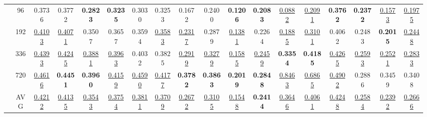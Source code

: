 \begin{table}[!t]
{{\begin{tabular}{l|c|cc|cc|cc|cc|cc|cc|cc|cc}
& 96  & 0.3736 & 0.3772 & \textbf{0.2823} & \textbf{0.3235} & 0.3030 & 0.3253 & 0.1672 & 0.2400 & \textbf{0.1206} & \textbf{0.2083} & \underline{0.0882} & \underline{0.2091} & \textbf{0.3762} & \textbf{0.2372} & \underline{0.1573} & \underline{0.1975} \\
& 192 & \underline{0.4103} & \underline{0.4071} & 0.3507 & 0.3657 & 0.3594 & \underline{0.3583} & \underline{0.2317} & 0.2879 & \underline{0.1381} & 0.2264 & \underline{0.1885} & \underline{0.3101} & 0.4062 & 0.2483 & \textbf{0.2015} & \underline{0.2448} \\
& 336 & \underline{0.4393} & \underline{0.4245} & \underline{0.3881} & \underline{0.3963} & 0.4032 & 0.3825 & \underline{0.2919} & \underline{0.3279} & \underline{0.1585} & \underline{0.2459} & \textbf{0.3354} & \textbf{0.4185} & \underline{0.4265} & \underline{0.2593} & \underline{0.2521} & \underline{0.2833} \\
& 720 & \underline{0.4616} & \textbf{0.4451} & \textbf{0.3960} & \underline{0.4159} & \underline{0.4590} & \underline{0.4177} & \textbf{0.3782} & \textbf{0.3863} & \textbf{0.2019} & \textbf{0.2848} & \underline{0.8463} & \underline{0.6865} & \underline{0.4902} & 0.2886 & 0.3459 & 0.3408 \\
& AVG & \underline{0.4212} & \underline{0.4135} & \underline{0.3543} & \underline{0.3754} & \underline{0.3811} & \underline{0.3709} & \underline{0.2672} & \underline{0.3105} & \underline{0.1548} & \textbf{0.2414} & \underline{0.3646} & \underline{0.4061} & \underline{0.4248} & \underline{0.2584} & \underline{0.2392} & \underline{0.2666} \\
\midrule


\end{tabular}}}
\end{table}
